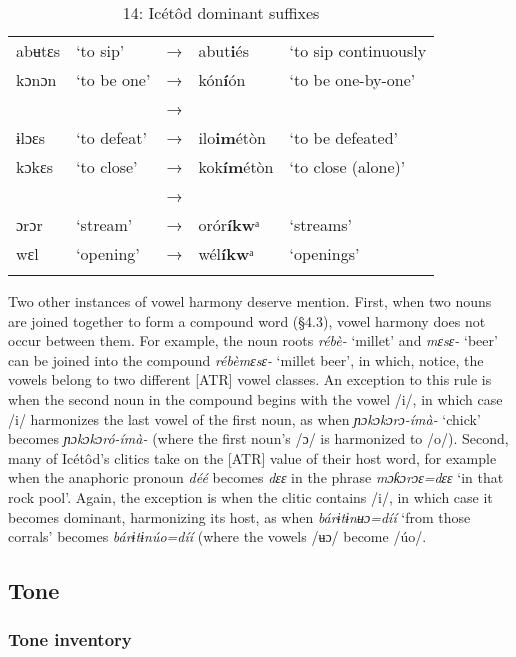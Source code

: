 \begin{table}
\caption{14: Icétôd dominant suffixes}
\label{tab:2}


\begin{tabularx}{\textwidth}{XXXXX}
\lsptoprule

abʉtɛs & ‘to sip’ & → & abut\textbf{i}és & ‘to sip continuously\\
kɔnɔn & ‘to be one’ & → & kón\textbf{í}ón & ‘to be one-by-one’\\
&  & → &  & \\
ɨlɔɛs & ‘to defeat’ & → & ilo\textbf{im}étòn & ‘to be defeated’\\
kɔkɛs & ‘to close’ & → & kok\textbf{ím}étòn & ‘to close (alone)’\\
&  & → &  & \\
ɔrɔr & ‘stream’ & → & orór\textbf{íkw}ᵃ & ‘streams’\\
wɛl & ‘opening’ & → & wél\textbf{íkw}ᵃ & ‘openings’\\
\lspbottomrule
\end{tabularx}
\end{table}
Two other instances of vowel harmony deserve mention. First, when two nouns are joined together to form a compound word (§4.3), vowel harmony does not occur between them. For example, the noun roots \textit{rébè- }‘millet’ and \textit{mɛsɛ-} ‘beer’ can be joined into the compound \textit{rébèmɛsɛ- }‘millet beer’, in which, notice, the vowels belong to two different [ATR] vowel classes. An exception to this rule is when the second noun in the compound begins with the vowel /i/, in which case /i/ harmonizes the last vowel of the first noun, as when \textit{ɲɔkɔkɔrɔ-ímà- }‘chick’ becomes \textit{ɲɔkɔkɔró-ímà-} (where the first noun’s /ɔ/ is harmonized to /o/). Second, many of Icétôd’s clitics take on the [ATR] value of their host word, for example when the anaphoric\textsc{ }pronoun \textit{déé }becomes \textit{dɛɛ }in the phrase \textit{mɔƙɔrɔɛ=dɛɛ }‘in that rock pool’. Again, the exception is when the clitic contains /i/, in which case it becomes dominant, harmonizing its host, as when \textit{bárɨtɨnʉɔ=díí }‘from those corrals’ becomes \textit{bárɨtɨnúo=díí }(where the vowels /ʉɔ/ become /úo/.
 
\subsection{Tone}
\subsubsection{Tone inventory}


